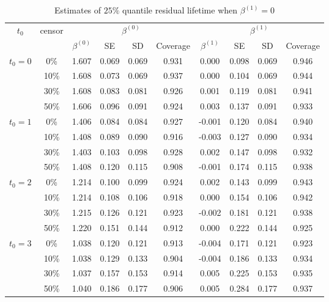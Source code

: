 \documentclass[12pt]{article}
\begin{document}
	\begin{table}[H]
		\caption{Estimates of $25\%$ quantile residual lifetime when $\beta^{(1)}=0$}
		\centering
		\begin{tabular}{|c|c|c|c|c|c|c|c|c|c|}
			\hline
			\multirow{2}{*}{$t_0$} & \multirow{2}{*}{censor} & \multicolumn{4}{c|}{$\beta^{(0)}$} & \multicolumn{4}{c|}{$\beta^{(1)}$}\\ \cline{3-10}
			& & $\beta^{(0)}$ & SE & SD  & Coverage  & $\beta^{(1)}$ & SE & SD & Coverage\\
			\hline\hline
			\multirow{4}{*}{$t_0=0$} & 0\% & 1.607 & 0.069 & 0.069 & 0.931 & 0.000 & 0.098 & 0.069 & 0.946 \\
			& 10\% & 1.608 & 0.073 & 0.069 & 0.937 & 0.000 & 0.104 & 0.069 & 0.944 \\
			& 30\% & 1.608 & 0.083 & 0.081 & 0.926 & 0.001 & 0.119 & 0.081 & 0.941 \\
			& 50\% & 1.606 & 0.096 & 0.091 & 0.924 & 0.003 & 0.137 & 0.091 & 0.933 \\
			\hline
			\multirow{4}{*}{$t_0=1$} & 0\% & 1.406 & 0.084 & 0.084 & 0.927 & -0.001 & 0.120 & 0.084 & 0.940 \\
			& 10\% & 1.408 & 0.089 & 0.090 & 0.916 & -0.003 & 0.127 & 0.090 & 0.934 \\
			& 30\% & 1.403& 0.103 & 0.098 & 0.928 & 0.002 & 0.147 & 0.098 & 0.932 \\
			& 50\% & 1.408 & 0.120 & 0.115 & 0.908 & -0.001 & 0.174 & 0.115 & 0.938 \\
			\hline
			\multirow{4}{*}{$t_0=2$} & 0\% & 1.214 & 0.100 & 0.099 & 0.924 & 0.002 & 0.143 & 0.099 & 0.943 \\
			& 10\% & 1.214 & 0.108 & 0.106 & 0.918 & 0.000 & 0.154 & 0.106 & 0.942 \\
			& 30\% & 1.215 & 0.126 & 0.121 & 0.923 & -0.002 & 0.181 & 0.121 & 0.938 \\
			& 50\% & 1.220 & 0.151 & 0.144 & 0.912 & 0.000 & 0.222 & 0.144 & 0.925 \\
			\hline
			\multirow{4}{*}{$t_0=3$} & 0\% & 1.038 & 0.120 & 0.121 & 0.913 & -0.004 & 0.171 & 0.121 & 0.923 \\
			& 10\% & 1.038 & 0.129 & 0.133 & 0.904 & -0.004 & 0.186 & 0.133 & 0.934 \\
			& 30\% & 1.037 & 0.157 & 0.153 & 0.914 & 0.005 & 0.225 & 0.153 & 0.935 \\
			& 50\% & 1.040 & 0.186 & 0.177 & 0.906 & 0.005 & 0.284 & 0.177 & 0.937 \\
			\hline
		\end{tabular}
	\end{table}
\end{document}
